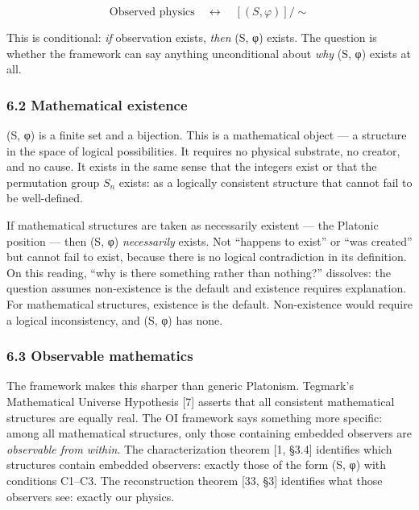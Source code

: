 \documentclass[
]{article}
\begin{document}
\[\text{Observed physics} \quad \longleftrightarrow \quad [(S, \varphi)] / \sim\]

This is conditional: \emph{if} observation exists, \emph{then} (S, φ)
exists. The question is whether the framework can say anything
unconditional about \emph{why} (S, φ) exists at all.

\hypertarget{mathematical-existence}{%
\subsubsection{6.2 Mathematical
existence}\label{mathematical-existence}}

(S, φ) is a finite set and a bijection. This is a mathematical object
--- a structure in the space of logical possibilities. It requires no
physical substrate, no creator, and no cause. It exists in the same
sense that the integers exist or that the permutation group \(S_n\)
exists: as a logically consistent structure that cannot fail to be
well-defined.

If mathematical structures are taken as necessarily existent --- the
Platonic position --- then (S, φ) \emph{necessarily} exists. Not
``happens to exist'' or ``was created'' but cannot fail to exist,
because there is no logical contradiction in its definition. On this
reading, ``why is there something rather than nothing?'' dissolves: the
question assumes non-existence is the default and existence requires
explanation. For mathematical structures, existence is the default.
Non-existence would require a logical inconsistency, and (S, φ) has
none.

\hypertarget{observable-mathematics}{%
\subsubsection{6.3 Observable
mathematics}\label{observable-mathematics}}

The framework makes this sharper than generic Platonism. Tegmark's
Mathematical Universe Hypothesis {[}7{]} asserts that all consistent
mathematical structures are equally real. The OI framework says
something more specific: among all mathematical structures, only those
containing embedded observers are \emph{observable from within}. The
characterization theorem {[}1, §3.4{]} identifies which structures
contain embedded observers: exactly those of the form (S, φ) with
conditions C1--C3. The reconstruction theorem {[}33, §3{]} identifies
what those observers see: exactly our physics.
\end{document}
